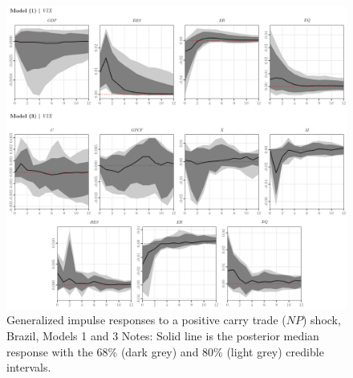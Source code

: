 \documentclass[a4paper, twoside]{templates/ociamthesis}
\begin{document}
\begin{figure}[!ht]

{\centering \includegraphics[width=0.99\columnwidth]{figure/g.MODEL13.NPHIGHER.TARGET.BR} 

}

\caption[Generalized impulse responses to a positive carry trade ($NP$) shock, Brazil, Models 1 and 3]{Generalized impulse responses to a positive carry trade ($NP$) shock, Brazil, Models 1 and 3 \newline \scriptsize Notes: Solid line is the posterior median response with the 68\% (dark grey) and 80\% (light grey) credible intervals.}\label{fig:Figure54}
\end{figure}

\clearpage
\end{document}
